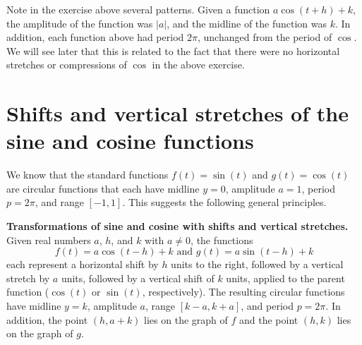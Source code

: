 \documentclass{ximera}
\begin{document}
Note in the exercise above several patterns. Given a function $a\cos(t + h) + k$, the amplitude of the function was $|a|$, and the midline of the function was $k$. In addition, each function above had period $2\pi$, unchanged from the period of $\cos$. We will see later that this is related to the fact that there were no horizontal stretches or compressions of $\cos$ in the above exercise. 
%
%
%
\section{Shifts and vertical stretches of the sine and cosine functions}
We know that the standard functions \(f(t) = \sin(t)\) and \(g(t) = \cos(t)\) are circular functions that each have midline \(y = 0\), amplitude \(a = 1\), period \(p = 2\pi\), and range \([-1,1]\). This suggests the following general principles.%
\begin{callout}
\textbf{Transformations of sine and cosine with shifts and vertical stretches.}\\
Given real numbers \(a\), \(h\), and \(k\) with \(a \ne 0\), the functions%
\[
f(t) = a\cos(t-h)+k \text{ and } g(t) = a\sin(t-h) + k
\]
each represent a horizontal shift by \(h\) units to the right, followed by a vertical stretch by \(a\) units, followed by a vertical shift of \(k\) units, applied to the parent function (\(\cos(t)\) or \(\sin(t)\), respectively).  The resulting circular functions have midline \(y = k\), amplitude \(a\), range \([k-a,k+a]\), and period \(p = 2\pi\).  In addition, the point \((h,a+k)\) lies on the graph of \(f\) and the point \((h, k)\) lies on the graph of \(g\).%
\end{callout}
\end{document}
